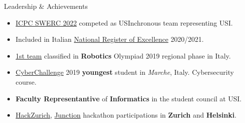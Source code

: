 \documentclass{cv} %
\begin{document}
\begin{minipage}[b][0.9\paperheight][t]{0.7\linewidth}
\begin{rSection}{Leadership \& Achievements}
\begin{itemize}[leftmargin=*]
    \item \href{https://icpc.global/ICPCID/ZOI3HF9XDUH8}{ICPC SWERC 2022}
        competed as USInchronous team representing USI.

    \item Included in Italian \href{https://www.indire.it/eccellenze/}{National Register of Excellence} 2020/2021.

    \item \href{https://www.makerslab.it/olimpiadi-robotiche-ancona-2019/}{1st team}
        classified in \textbf{Robotics} Olympiad 2019 regional phase in Italy. %

    \item \href{https://cyberchallenge.it/}{CyberChallenge} 2019 \textbf{youngest} student
        in \textit{Marche}, Italy. Cybersecurity course. %

    \item \textbf{Faculty Representantive} of \textbf{Informatics} in the student council at USI.

    \item \href{https://hackzurich.com/}{HackZurich}, 
        \href{https://www.junction2023.com/}{Junction} 
        hackathon participations in \textbf{Zurich} and \textbf{Helsinki}.
    \end{itemize}
\end{rSection}

\end{minipage}
\end{document}
